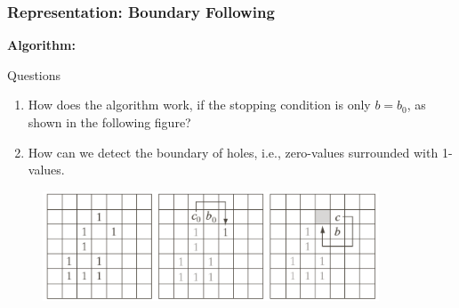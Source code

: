 \documentclass[english,11pt,table,handout]{beamer}
\begin{document}
\frame
{
	\frametitle{Representation: Boundary Following}
	\textbf{Algorithm:}
	\begin{alertblock}{Questions}
		\begin{enumerate}
			\item How does the algorithm work, if the stopping condition is only $b = b_0$, as shown in the following figure?
			\item How can we detect the boundary of holes, i.e., zero-values surrounded with 1-values.
		\end{enumerate}
	\end{alertblock}
	
	\begin{figure}[!h]
		\includegraphics[width=10cm]{bfollow_4.png}
	\end{figure}	
}
\end{document}
